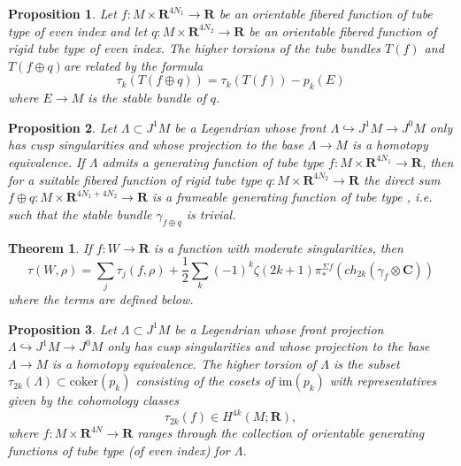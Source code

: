 \documentclass[10pt,a4paper]{amsart}
\newtheorem{proposition}{Proposition}
\newtheorem{theorem}{Theorem}
\def\bC{\mathbf{C}}
\def\bR{\mathbf{R}}
\begin{document}
\begin{proposition}\label{prop: effect twisted stab}
Let $f:M \times \bR^{4N_1} \to \bR$ be an orientable  fibered  function of tube type of even index and let $q:M \times \bR^{4N_2} \to \bR$ be an orientable fibered function of rigid tube type of even index. The higher torsions of the tube bundles $T(f)$ and $T(f \oplus q)$are related by the formula
$$ \tau_k(T(f \oplus q) ) = \tau_k(T(f))  - p_k(E) $$
where $E \to M$ is the stable bundle of $q$.
\end{proposition}

\begin{proposition}\label{prop: framing for special Leg}
Let $\Lambda \subset J^1M$ be a Legendrian whose front  $\Lambda \hookrightarrow J^1M \to J^0M$ only has cusp singularities and whose projection to the base $\Lambda \to M$ is a homotopy equivalence. If $\Lambda$ admits a generating function of tube type $f:M \times \bR^{4N_1} \to \bR$, then for a suitable fibered function of rigid tube type $q:M \times \bR^{4N_2} \to \bR$ the direct sum $f \oplus q : M \times \bR^{4N_1+4N_2} \to \bR$ is a frameable generating function of tube type , i.e. such that the stable bundle $\gamma_{f \oplus q}$ is trivial. \end{proposition}

\begin{theorem}\label{thm: framing} If  $f:W \to \bR$ is a function with moderate singularities, then
\begin{equation}\label{eq:FramingPrinciple}
\tau(W,\rho)=\sum_j\tau_j(f,\rho)+ \frac12 \sum_k (-1)^k \zeta(2k+1) \pi_\ast^{\Sigma f} \left( ch_{2k}(\gamma_f\otimes\bC)\right) 
\end{equation}
where the terms are defined below.
\end{theorem}

\begin{proposition}\label{prop: torsion for special Leg}
Let $\Lambda \subset J^1M$ be a Legendrian whose front projection $\Lambda \hookrightarrow J^1M \to J^0M$ only has cusp singularities and whose projection to the base $\Lambda \to M$ is a homotopy equivalence. The higher torsion of $\Lambda$ is the subset $\tau_{2k}(\Lambda) \subset \text{coker}(p_k)$ consisting of the cosets of $\text{im}(p_k)$ with representatives given by the cohomology classes $$\tau_{2k}(f)\in H^{4k}(M;\bR),$$ where $f:M \times \bR^{4N} \to \bR$ ranges through the collection of orientable generating functions of tube type (of even index) for $\Lambda$. 
\end{proposition}
\end{document}
